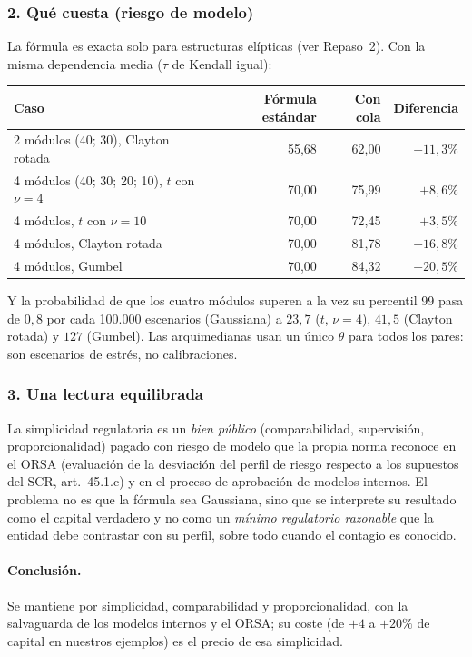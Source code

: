 \documentclass[a4paper,12pt]{article}
\begin{document}
\subsubsection*{2. Qué cuesta (riesgo de modelo)}
La fórmula es exacta solo para estructuras elípticas (ver Repaso~2). Con la misma dependencia media ($\tau$ de Kendall igual):
\begin{center}
\small
\begin{tabular}{lrrr}
\toprule
Caso & Fórmula estándar & Con cola & Diferencia\\
\midrule
2 módulos (40; 30), Clayton rotada & 55,68 & 62,00 & $+11{,}3\%$\\
4 módulos (40; 30; 20; 10), $t$ con $\nu=4$ & 70,00 & 75,99 & $+8{,}6\%$\\
4 módulos, $t$ con $\nu=10$ & 70,00 & 72,45 & $+3{,}5\%$\\
4 módulos, Clayton rotada & 70,00 & 81,78 & $+16{,}8\%$\\
4 módulos, Gumbel & 70,00 & 84,32 & $+20{,}5\%$\\
\bottomrule
\end{tabular}
\end{center}
Y la probabilidad de que los cuatro módulos superen a la vez su percentil 99 pasa de $0{,}8$ por cada 100.000 escenarios (Gaussiana) a $23{,}7$ ($t$, $\nu=4$), $41{,}5$ (Clayton rotada) y $127$ (Gumbel). Las arquimedianas usan un único $\theta$ para todos los pares: son escenarios de estrés, no calibraciones.

\subsubsection*{3. Una lectura equilibrada}
La simplicidad regulatoria es un \emph{bien público} (comparabilidad, supervisión, proporcionalidad) pagado con riesgo de modelo que la propia norma reconoce en el ORSA (evaluación de la desviación del perfil de riesgo respecto a los supuestos del SCR, art.~45.1.c) y en el proceso de aprobación de modelos internos. El problema no es que la fórmula sea Gaussiana, sino que se interprete su resultado como el capital \guillemotleft{}verdadero\guillemotright{} y no como un \emph{mínimo regulatorio razonable} que la entidad debe contrastar con su perfil, sobre todo cuando el contagio es conocido.

\paragraph{Conclusión.} Se mantiene por simplicidad, comparabilidad y proporcionalidad, con la salvaguarda de los modelos internos y el ORSA; su coste (de $+4$ a $+20\%$ de capital en nuestros ejemplos) es el precio de esa simplicidad.
\end{document}
